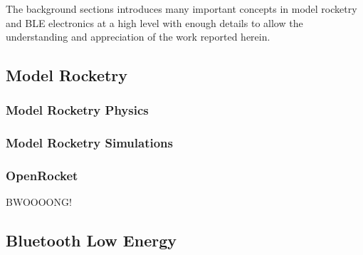 \documentclass{workreport}
\begin{document}
\begin{body}
	The background sections introduces many important concepts in model rocketry and BLE electronics at a high level with enough details to allow the understanding and appreciation of the work reported herein.


\subsection{Model Rocketry}

	\lipsum[2]

\subsubsection{Model Rocketry Physics}

	\lipsum[1]

\subsubsection{Model Rocketry Simulations}

	\lipsum[1]

\subsubsection{OpenRocket}

	\lipsum[1]

	BWOOOONG!

\subsection{Bluetooth Low Energy}


\end{body}
\end{document}
